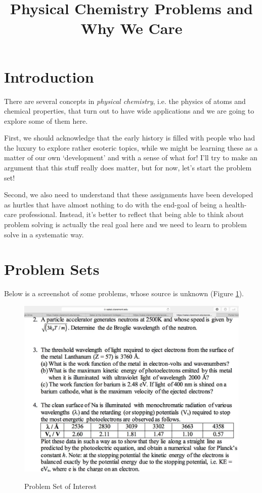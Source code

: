 \documentclass{article}
\title{Physical Chemistry Problems and Why We Care}
\begin{document}

\maketitle

\section{Introduction}

There are several concepts in \emph{physical chemistry}, i.e. the physics of atoms and chemical properties, that turn out to have wide applications and we are going to explore some of them here. 

First, we should acknowledge that the early history is filled with people who had the luxury to explore rather esoteric topics, while we might be learning these as a matter of our own `development' and with a sense of what for!  I'll try to make an argument that this stuff really does matter, but for now, let's start the problem set!

Second, we also need to understand that these assignments have been developed as hurtles that have almost nothing to do with the end-goal of being a health-care professional. Instead, it's better to reflect that being able to think about problem solving is actually the real goal here and we need to learn to problem solve in a systematic way.

\section{Problem Sets}

Below is a screenshot of some problems, whose source is unknown (Figure \ref{fig:problemset}).

\begin{figure}
\includegraphics{ProblemSet}
\label{fig:problemset}
\caption{Problem Set of Interest}
\end{figure}
\end{document}
